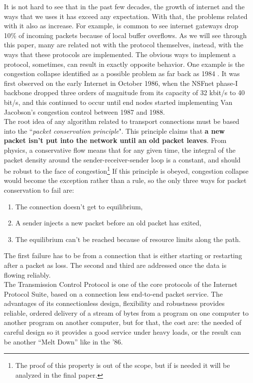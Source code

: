 It is not hard to see that in the past few decades, the growth of internet and the
ways that we uses it has exceed any expectation. With that, the problems related
with it also as increase. For example, is common to see internet gateways drop
10\% of incoming packets because of local buffer overflows. As we will see
through this paper, many are related not with the protocol themselves, instead,
with the ways that these protocols are implemented. The obvious ways to
implement a protocol, sometimes, can result in exactly opposite behavior. One
example is the congestion collapse identified as a possible problem as far back
as 1984 \cite{rfc896}.  It was first observed on the early Internet in October
1986, when the NSFnet phase-I backbone dropped three orders of magnitude from
its capacity of 32 kbit/s to 40 bit/s, and this continued to occur until end
nodes started implementing Van Jacobson's congestion control between 1987 and
1988.\\

The root idea of any algorithm related to transport connections must be based
into the ``\textit{packet conservation principle}". This principle claims that
\textbf{a new packet isn't put into the network until an old packet leaves}.
From physics, a conservative flow means that for any given time, the integral of
the packet density around the sender-receiver-sender loop is a constant, and
should be robust to the face of congestion\footnote{The proof of this property
is out of the scope, but if is needed it will be analyzed in the final paper.}
If this principle is obeyed, congestion collapse would become the exception
rather than a rule, so the only three ways for packet conservation to fail are:

\begin{enumerate}
\item The connection doesn't get to equilibrium,
\item A sender injects a new packet before an old packet has exited,
\item The equilibrium can't be reached because of resource limits along the path.
\end{enumerate}


The first failure has to be from a connection that is either starting or
restarting after a packet as loss. The second and third are addressed once the
data is flowing reliably.\\

The Transmission Control Protocol is one of the core protocols of the Internet
Protocol Suite, based on a connection less end-to-end packet service. The
advantages of its connectionless design, flexibility and robustness provides
reliable, ordered delivery of a stream of bytes from a program on one
computer to another program on another computer, but for that, the cost are: the
needed of careful design so it provides a good service under heavy loads, or the
result can be another ``Melt Down'' like in the '86. \\


